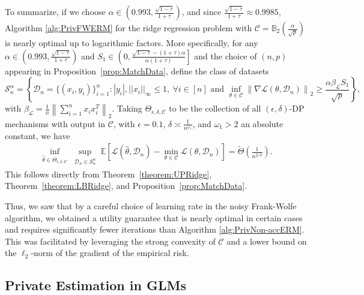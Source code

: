 \documentclass{article}
\begin{document}
To summarize, if we choose $\alpha \in \left(0.993, \frac{\sqrt{1 - \tau}}{1 + \tau}\right)$, and since $\frac{\sqrt{1 - \tau}}{1 + \tau} \approx 0.9985$, Algorithm \ref{alg:PrivFWERM} for the ridge regression problem with $\mathcal{C} = \mathbb{B}_2\left(\frac{\alpha}{\sqrt{p}}\right)$ is nearly optimal up to logarithmic factors. More specifically, for any $\alpha \in \left(0.993, \frac{\sqrt{1 - \tau}}{1 + \tau}\right)$ and $S_1 \in \left(0, \frac{\sqrt{1 - \tau} - (1 + \tau)\alpha}{\alpha(1 + \tau)}\right]$
and the choice of $(n,p)$ appearing in Proposition~\ref{prop:MatchData}, define
the class of datasets
$$\mathcal{S}_n^\alpha = \left\{\mathcal{D}_n = \{(x_i, y_i)\}_{i = 1}^n: 
|y_i|, ||x_i||_{\infty} \leq 1, \ \forall i \in [n]  \mbox{ and } \mathop{\inf}\limits_{\theta \in \mathcal{C}}\left\|\nabla\mathcal{L}(\theta, \mathcal{D}_n)\right\|_2 \geq \frac{\alpha\beta_{\mathcal{L}}S_1}{\sqrt{p}}\right\},$$
with $\beta_{\mathcal{L}} = \frac{1}{n}\left\|\sum_{i = 1}^nx_ix_i^T\right\|_2$.
Taking $\Theta_{\epsilon, \delta, \mathcal{C}}$ to be the collection of all $(\epsilon, \delta)$-DP mechanisms with output in $\mathcal{C}$, with $\epsilon = 0.1$, $\delta \asymp \frac{1}{n^{\omega_1}}$, and $\omega_1 > 2$ an absolute constant, we have
\begin{align*}
\mathop{\inf}\limits_{\hat{\theta} \in \Theta_{\epsilon, \delta, \mathcal{C}}} \mathop{\sup}_{\substack{\mathcal{D}_n \in \mathcal{S}_n^\alpha}} \mathbb{E}\left[\mathcal{L}(\hat{\theta}, \mathcal{D}_n) - \mathop{\min}\limits_{\theta \in \mathcal{C}}\mathcal{L}(\theta, \mathcal{D}_n)\right] = \widetilde{\Theta}\left(\frac{1}{n^{2/3}}\right).
\end{align*} 
This follows directly from Theorem~\ref{theorem:UPRidge}, Theorem~\ref{theorem:LBRidge}, and Proposition~\ref{prop:MatchData}. 

Thus, we saw that by a careful choice of learning rate in the noisy Frank-Wolfe algorithm, we obtained a utility guarantee that is nearly optimal in certain cases and requires significantly fewer iterations than Algorithm \ref{alg:PrivNon-accERM}. This was facilitated by leveraging the strong convexity of $\mathcal{C}$ and a lower bound on the $\ell_2$-norm of the gradient of the empirical risk. 


\subsection{Private Estimation in GLMs}
\label{sec:Private Biased Parameter Estimation in GLMs: Upper and Lower Bounds for Excess Risk}
\end{document}
